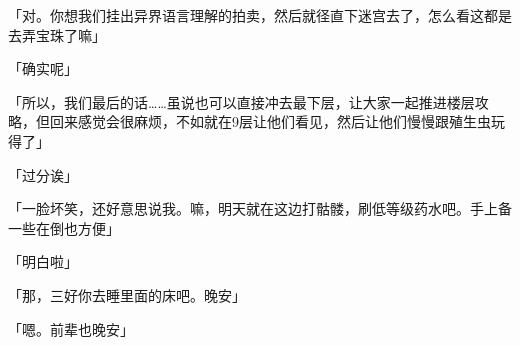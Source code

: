 「对。你想我们挂出异界语言理解的拍卖，然后就径直下迷宫去了，怎么看这都是去弄宝珠了嘛」

「确实呢」

「所以，我们最后的话……虽说也可以直接冲去最下层，让大家一起推进楼层攻略，但回来感觉会很麻烦，不如就在9层让他们看见，然后让他们慢慢跟殖生虫玩得了」

「过分诶」

「一脸坏笑，还好意思说我。嘛，明天就在这边打骷髅，刷低等级药水吧。手上备一些在倒也方便」

「明白啦」

「那，三好你去睡里面的床吧。晚安」

「嗯。前辈也晚安」\\
